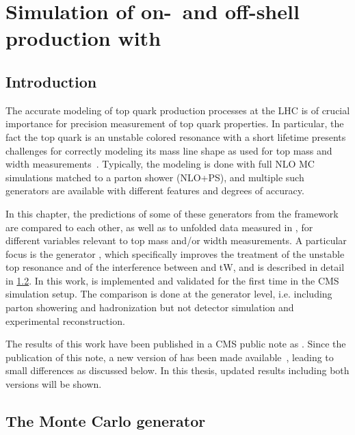 \chapter{Simulation of on-~and off-shell \ttbartitle production with \texorpdfstring{\bbfourl}{bb4l}}
\label{ch:bb4l}

\section{Introduction}

The accurate modeling of top quark production processes at the LHC is of crucial importance for precision measurement of top quark properties. In particular, the fact the top quark is an unstable colored resonance with a short lifetime presents challenges for correctly modeling its mass line shape as used for top mass and width measurements~\cite{Tarrach:1980up,Smith:1996xz,Hoang:2020iah}. Typically, the modeling is done with full NLO MC simulations matched to a parton shower (NLO+PS), and multiple such generators are available with different features and degrees of accuracy.

In this chapter, the predictions of some of these generators from the \powheg framework~\cite{Powheg:2004,Powheg:2007} are compared to each other, as well as to unfolded data measured in , for different variables relevant to top mass and/or width measurements. A particular focus is the generator \bbfourl \cite{Jezo:2016ujg}, which specifically improves the treatment of the unstable top resonance and of the interference between \ttbar and tW, and is described in detail in \cref{sec:bb4l:bb4l}. In this work, \bbfourl is implemented and validated for the first time in the CMS simulation setup. The comparison is done at the generator level, i.e. including parton showering and hadronization but not detector simulation and experimental reconstruction.

The results of this work have been published in a CMS public note as . Since the publication of this note, a new version of \bbfourl has been made available~\cite{Jezo:2023rht}, leading to small differences as discussed below. In this thesis, updated results including both versions will be shown.

\section{The Monte Carlo generator \texorpdfstring{\bbfourl}{bb4l}}
\label{sec:bb4l:bb4l}

